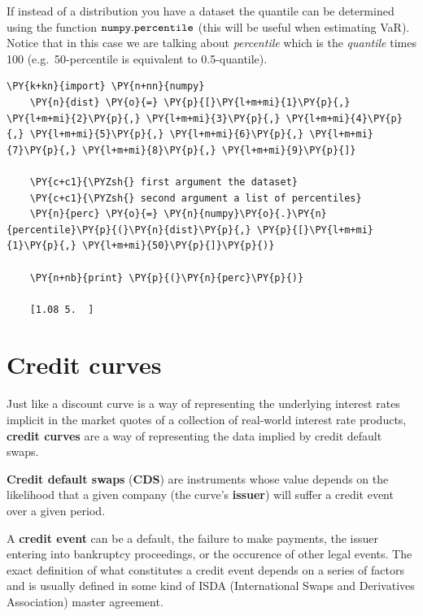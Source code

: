 If instead of a distribution you have a dataset the quantile can be
determined using the function \(\tt{numpy.percentile}\) (this will be
useful when estimating VaR). Notice that in this case we are talking
about \emph{percentile} which is the \emph{quantile} times 100
(e.g.~50-percentile is equivalent to 0.5-quantile).

\begin{tcolorbox}[breakable, size=fbox, boxrule=1pt, pad at break*=1mm,colback=cellbackground, colframe=cellborder]
	\begin{Verbatim}[commandchars=\\\{\}]
	\PY{k+kn}{import} \PY{n+nn}{numpy}
	\PY{n}{dist} \PY{o}{=} \PY{p}{[}\PY{l+m+mi}{1}\PY{p}{,} \PY{l+m+mi}{2}\PY{p}{,} \PY{l+m+mi}{3}\PY{p}{,} \PY{l+m+mi}{4}\PY{p}{,} \PY{l+m+mi}{5}\PY{p}{,} \PY{l+m+mi}{6}\PY{p}{,} \PY{l+m+mi}{7}\PY{p}{,} \PY{l+m+mi}{8}\PY{p}{,} \PY{l+m+mi}{9}\PY{p}{]}
	
	\PY{c+c1}{\PYZsh{} first argument the dataset}
	\PY{c+c1}{\PYZsh{} second argument a list of percentiles}
	\PY{n}{perc} \PY{o}{=} \PY{n}{numpy}\PY{o}{.}\PY{n}{percentile}\PY{p}{(}\PY{n}{dist}\PY{p}{,} \PY{p}{[}\PY{l+m+mi}{1}\PY{p}{,} \PY{l+m+mi}{50}\PY{p}{]}\PY{p}{)}
	
	\PY{n+nb}{print} \PY{p}{(}\PY{n}{perc}\PY{p}{)}
	
	[1.08 5.  ]
	\end{Verbatim}
\end{tcolorbox}

\section{Credit curves}\label{credit-curves}

Just like a discount curve is a way of representing the underlying
interest rates implicit in the market quotes of a collection of
real-world interest rate products, \textbf{credit curves} are a way of
representing the data implied by credit default swaps.

\textbf{Credit default swaps} (\textbf{CDS}) are instruments whose value
depends on the likelihood that a given company (the curve's
\textbf{issuer}) will suffer a credit event over a given period.

A \textbf{credit event} can be a default, the failure to make payments,
the issuer entering into bankruptcy proceedings, or the occurence of
other legal events. The exact definition of what constitutes a credit
event depends on a series of factors and is usually defined in some kind
of ISDA (International Swaps and Derivatives Association) master
agreement.

